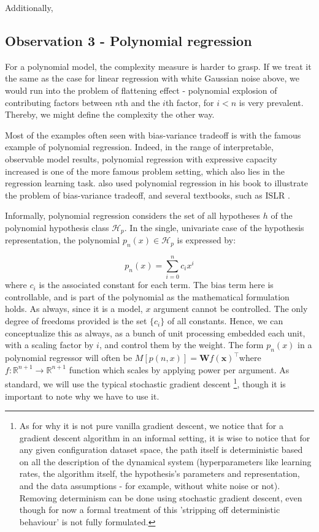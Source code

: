 \documentclass{article}
\begin{document}
Additionally, 

\clearpage

\subsection{Observation 3 - Polynomial regression}

For a polynomial model, the complexity measure is harder to grasp. If we treat it the same as the case for linear regression with white Gaussian noise above, we would run into the problem of flattening effect - polynomial explosion of contributing factors between $n$th and the $i$th factor, for $i<n$ is very prevalent. Thereby, we might define the complexity the other way. 

Most of the examples often seen with bias-variance tradeoff is with the famous example of polynomial regression. Indeed, in the range of interpretable, observable model results, polynomial regression with expressive capacity increased is one of the more famous problem setting, which also lies in the regression learning task. \cite{goodfellow2016deep} also used polynomial regression in his book to illustrate the problem of bias-variance tradeoff, and several textbooks, such as ISLR \cite{gareth_james_introduction_2013}. 

Informally, polynomial regression considers the set of all hypotheses $h$ of the polynomial hypothesis class $\mathcal{H}_{p}$. In the single, univariate case of the hypothesis representation, the polynomial $p_{n}(x)\in \mathcal{H}_{p}$ is expressed by: 

\begin{equation*}
    p_{n}(x)=\sum^{n}_{i=0}c_{i}x^{i}
\end{equation*}
where $c_{i}$ is the associated constant for each term. The bias term here is controllable, and is part of the polynomial as the mathematical formulation holds. As always, since it is a model, $x$ argument cannot be controlled. The only degree of freedoms provided is the set $\{ c_{i} \}$ of all constants. Hence, we can conceptualize this as always, as a bunch of unit processing embedded each unit, with a scaling factor by $i$, and control them by the weight. The form $p_{n}(x)$ in a polynomial regressor will often be $M[p(n,x)]=\mathbf{W}f(\mathbf{x})^{\top}$where $f:\mathbb{R}^{n+1}\to \mathbb{R}^{n+1}$ function which scales by applying power per argument. As standard, we will use the typical stochastic gradient descent \footnote{As for why it is not pure vanilla gradient descent, we notice that for a gradient descent algorithm in an informal setting, it is wise to notice that for any given configuration dataset space, the path itself is deterministic based on all the description of the dynamical system (hyperparameters like learning rates, the algorithm itself, the hypothesis's parameters and representation, and the data assumptions - for example, without white noise or not). Removing determinism can be done using stochastic gradient descent, even though for now a formal treatment of this 'stripping off deterministic behaviour' is not fully formulated. }, though it is important to note why we have to use it. 
\end{document}
